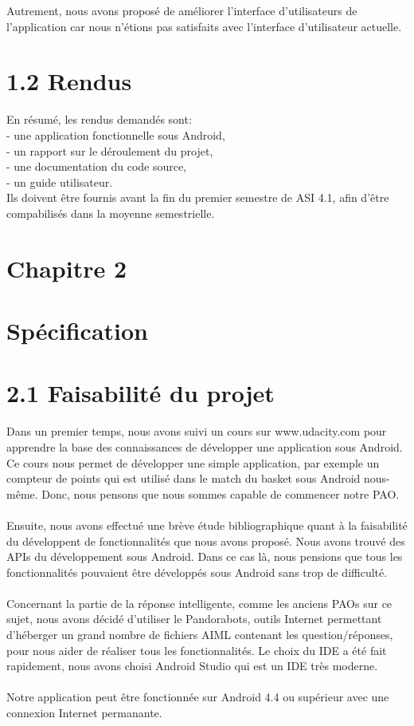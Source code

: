 \documentclass[pdftex, a4paper,12pt]{report}
\begin{document}
Autrement, nous avons proposé de améliorer l'interface d'utilisateurs de l'application car nous n'étions pas satisfaits avec l'interface d'utilisateur actuelle.

\section*{1.2 Rendus}
En résumé, les rendus demandés sont:\\
    \indent- une application fonctionnelle sous Android,\\
    \indent- un rapport sur le déroulement du projet,\\
    \indent- une documentation du code source,\\
    \indent- un guide utilisateur.\\
\indent Ils doivent être fournis avant la fin du premier semestre de ASI 4.1, afin d'être compabilisés dans la moyenne semestrielle.
\newpage


\section*{Chapitre 2}
\section*{Spécification}
\section*{2.1 Faisabilité du projet}
Dans un premier temps, nous avons suivi un cours sur www.udacity.com pour apprendre la base des connaissances de développer une application sous Android. Ce cours nous permet de développer une simple application, par exemple un compteur de points qui est utilisé dans le match du basket sous Android nous-même. Donc, nous pensons que nous sommes capable de commencer notre PAO.\\\\
\indent Ensuite, nous avons effectué une brève étude bibliographique quant à la faisabilité du développent de fonctionnalités que nous avons proposé. Nous avons trouvé des APIs du développement sous Android. Dans ce cas là, nous pensions que tous les fonctionnalités pouvaient être développés sous Android sans trop de difficulté. \\\\
\indent Concernant la partie de la réponse intelligente, comme les anciens PAOs sur ce sujet, nous avons décidé d'utiliser le Pandorabots, outils Internet permettant d'héberger un grand nombre de fichiers AIML contenant les question/réponses, pour nous aider de réaliser tous les fonctionnalités.
Le choix du IDE a été fait rapidement, nous avons choisi Android Studio qui est un IDE très moderne. \\\\
\indent Notre application peut être fonctionnée sur Android 4.4 ou supérieur avec une connexion Internet permanante.\\
\end{document}
